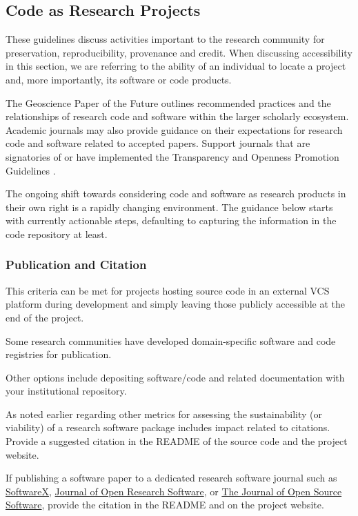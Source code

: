 \documentclass{article}
\newcounter{subsubsubsection}[subsubsection]
\begin{document}
\subsection{Code as Research Projects}
These guidelines discuss activities important to the research community for preservation, reproducibility, provenance and credit. When discussing accessibility in this section, we are referring to the ability of an individual to locate a project and, more importantly, its software or code products. 
 
The Geoscience Paper of the Future \autocite{gil_towards_2016} outlines recommended practices and the relationships of research code and software within the larger scholarly ecosystem. Academic journals may also provide guidance on their expectations for research code and software related to accepted papers. Support journals that are signatories of or have implemented the Transparency and Openness Promotion Guidelines \autocite{alter_transparency_2016}.
 
The ongoing shift towards considering code and software as research products in their own right is a rapidly changing environment. The guidance below starts with currently actionable steps, defaulting to capturing the information in the code repository at least.

\subsubsection{Publication and Citation}
This criteria can be met for projects hosting source code in an external VCS platform during development and simply leaving those publicly accessible at the end of the project. 
 
Some research communities have developed domain-specific software and code registries for publication. 
 
Other options include depositing software/code and related documentation with your institutional repository. 

As noted earlier regarding other metrics for assessing the sustainability (or viability) of a research software package includes impact related to citations. Provide a suggested citation in the README of the source code and the project website.
 
If publishing a software paper to a dedicated research software journal such as \href{http://www.journals.elsevier.com/softwarex/} {SoftwareX}, \href{http://openresearchsoftware.metajnl.com/} {Journal of Open Research Software}, or \href{http://joss.theoj.org/} {The Journal of Open Source Software}, provide the citation in the README and on the project website. 
 
\end{document}
